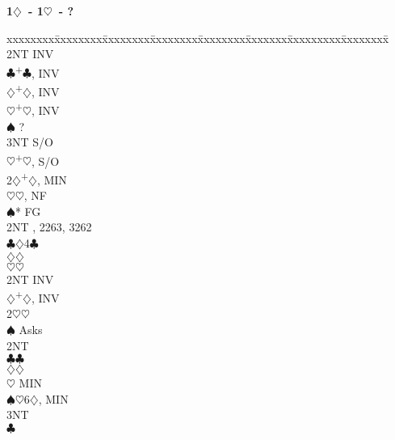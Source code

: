\documentclass[10pt]{article}
\renewcommand{\c}{$\clubsuit$}
\renewcommand{\d}{$\diamondsuit$}
\newcommand{\h}{$\heartsuit$}
\newcommand{\s}{$\spadesuit$}
\newcommand{\p}{\textsuperscript{+}}
\newenvironment{bidtable}[1][]
{\textbf{#1}
  \begin{adjustwidth}{1em}{}
    \addvspace{2pt}
    \begin{tabbing}
      xxxxxxxx\=xxxxxxxx\=xxxxxxxx\=xxxxxxxx\=xxxxxxxx\=xxxxxxx\=xxxxxxxxx\=xxxxxxxx\=\kill}
{\end{tabbing}\end{adjustwidth}\bigskip}%
\begin{document}
\begin{bidtable}[1\d\ - 1\h\ - ?]
     \> 2NT  \> INV                                             \\
     \c  {}\p\c, INV                                      \\
     \d  {}\p\d, INV                                      \\
     \h  {}\p\h, INV                                      \\
     \s  \> ?                                               \\
     \> 3NT  \> S/O                                             \\
     \h  {}\p\h, S/O                                      \\
2\d  {}\p\d, MIN                                              \\
     \h  {}\h, NF                                         \\
     \s* \> FG                                              \\
     \>      \> 2NT , 2263, 3262                         \\
     \>      \c {}\d 4\c                                  \\
     \>      \d {}\d                                      \\
     \>      \h {}\h                                      \\
     \> 2NT  \> INV                                             \\
     \d  {}\p\d, INV                                      \\
2\h  {}\h                                                     \\
     \s  \> Asks                                            \\
     \>      \> 2NT                                      \\
     \>      \c {}\c                                      \\
     \>      \d {}\d                                      \\
     \>      \h \> MIN                                      \\
     \>      \s {}\h 6\d, MIN                             \\
     \>      \> 3NT                                      \\
     \>      \c {}                                     \\

\end{bidtable}
\end{document}
